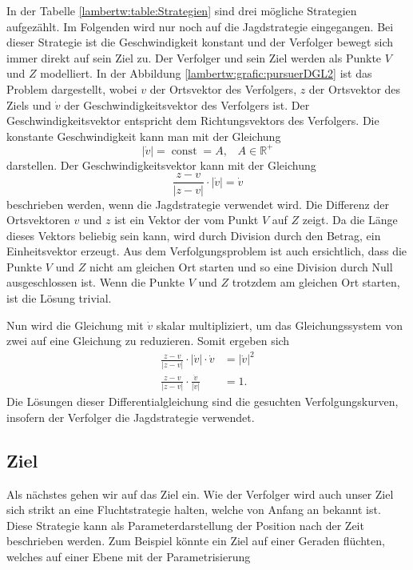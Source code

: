 %
In der Tabelle \ref{lambertw:table:Strategien} sind drei mögliche Strategien aufgezählt.
Im Folgenden wird nur noch auf die Jagdstrategie eingegangen.
Bei dieser Strategie ist die Geschwindigkeit konstant und der Verfolger bewegt sich immer direkt auf sein Ziel zu.
Der Verfolger und sein Ziel werden als Punkte $V$ und $Z$ modelliert.
In der Abbildung \ref{lambertw:grafic:pursuerDGL2} ist das Problem dargestellt,
wobei $v$ der Ortsvektor des Verfolgers, $z$ der Ortsvektor des Ziels und $\dot{v}$ der Geschwindigkeitsvektor des Verfolgers ist.
Der Geschwindigkeitsvektor entspricht dem Richtungsvektors des Verfolgers.
Die konstante Geschwindigkeit kann man mit der Gleichung
\begin{equation}
    |\dot{v}|
    = \operatorname{const} = A
    \text{,}\quad A\in\mathbb{R}^+
\end{equation}
darstellen. Der Geschwindigkeitsvektor kann mit der Gleichung
\begin{equation}
    \frac{z-v}{|z-v|}\cdot|\dot{v}|
    =
    \dot{v}
\end{equation}
beschrieben werden, wenn die Jagdstrategie verwendet wird.
Die Differenz der Ortsvektoren $v$ und $z$ ist ein Vektor der vom Punkt $V$ auf $Z$ zeigt.
Da die Länge dieses Vektors beliebig sein kann, wird durch Division durch den Betrag, ein Einheitsvektor erzeugt.
Aus dem Verfolgungsproblem ist auch ersichtlich, dass die Punkte $V$ und $Z$ nicht am gleichen Ort starten und so eine Division durch Null ausgeschlossen ist.
Wenn die Punkte $V$ und $Z$ trotzdem am gleichen Ort starten, ist die Lösung trivial.

Nun wird die Gleichung mit $\dot{v}$ skalar multipliziert, um das Gleichungssystem von zwei auf eine Gleichung zu reduzieren. Somit ergeben sich
\begin{align}
    \frac{z-v}{|z-v|}\cdot|\dot{v}|\cdot\dot{v}
    &=
    |\dot{v}|^2
    \\
    \label{lambertw:pursuerDGL}
    \frac{z-v}{|z-v|}\cdot \frac{\dot{v}}{|\dot{v}|}
    &=
    1 \text{.}
\end{align}
Die Lösungen dieser Differentialgleichung sind die gesuchten Verfolgungskurven, insofern der Verfolger die Jagdstrategie verwendet.
%
\subsection{Ziel
\label{lambertw:subsection:Ziel}}
Als nächstes gehen wir auf das Ziel ein.
Wie der Verfolger wird auch unser Ziel sich strikt an eine Fluchtstrategie halten, welche von Anfang an bekannt ist.
Diese Strategie kann als Parameterdarstellung der Position nach der Zeit beschrieben werden.
Zum Beispiel könnte ein Ziel auf einer Geraden flüchten, welches auf einer Ebene mit der Parametrisierung

